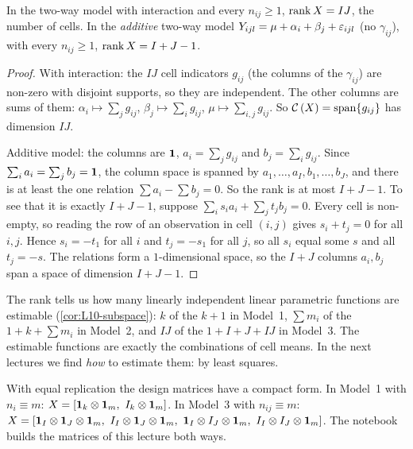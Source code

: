 \begin{proposition}\label{prop:L11-tworank}
In the two-way model with interaction and every $n_{ij}\ge1$, $\operatorname{rank} X=IJ$, the number of cells.
In the \emph{additive} two-way model $Y_{ijl}=\mu+\alpha_i+\beta_j+\varepsilon_{ijl}$ (no $\gamma_{ij}$), with every
$n_{ij}\ge 1$, $\operatorname{rank} X=I+J-1$.
\end{proposition}
\begin{proof}
With interaction: the $IJ$ cell indicators $g_{ij}$ (the columns of the $\gamma_{ij}$) are non-zero with disjoint
supports, so they are independent. The other columns are sums of them: $\alpha_i\mapsto\sum_j g_{ij}$,
$\beta_j\mapsto\sum_i g_{ij}$, $\mu\mapsto\sum_{i,j}g_{ij}$. So $\mathcal{C}\left(X\right)=\mathrm{span}\{g_{ij}\}$ has dimension $IJ$.

Additive model: the columns are $\mathbf 1$, $a_i=\sum_j g_{ij}$ and $b_j=\sum_i g_{ij}$. Since
$\sum_i a_i=\sum_jb_j=\mathbf 1$, the column space is spanned by $a_1,\dots,a_I,b_1,\dots,b_J$, and there is at least the one
relation $\sum a_i-\sum b_j=0$. So the rank is at most $I+J-1$. To see that it is exactly $I+J-1$, suppose
$\sum_i s_ia_i+\sum_j t_jb_j=0$. Every cell is non-empty, so reading the row of an observation in
cell $(i,j)$ gives $s_i+t_j=0$ for all $i,j$. Hence $s_i=-t_1$ for all $i$ and $t_j=-s_1$ for all $j$, so
all $s_i$ equal some $s$ and all $t_j=-s$. The relations form a $1$-dimensional space, so the
$I+J$ columns $a_i,b_j$ span a space of dimension $I+J-1$.
\end{proof}

\begin{note}
The rank tells us how many linearly independent linear parametric functions are estimable
(\cref{cor:L10-subspace}): $k$ of the $k+1$ in Model~1, $\sum m_i$ of the $1+k+\sum m_i$ in Model~2,
and $IJ$ of the $1+I+J+IJ$ in Model~3. The estimable functions are exactly the combinations of
cell means. In the next lectures we find \emph{how} to estimate them: by least squares.
\end{note}

\begin{note}
With equal replication the design matrices have a compact form. In Model~1 with $n_i\equiv m$:
$X=[\one_k\otimes\one_m,\ I_k\otimes\one_m]$. In Model~3 with $n_{ij}\equiv m$:
$X=[\one_I\otimes\one_J\otimes\one_m,\ I_I\otimes\one_J\otimes\one_m,\ \one_I\otimes I_J\otimes\one_m,\ I_I\otimes I_J\otimes\one_m]$.
The notebook builds the matrices of this lecture both ways.
\end{note}

